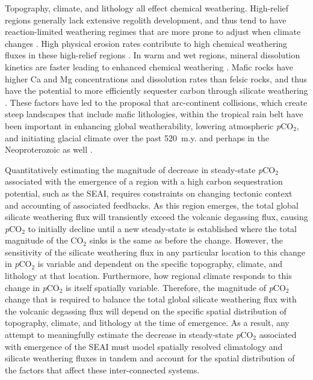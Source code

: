 \documentclass[9pt,twocolumn,twoside,lineno]{pnas-new}
\newcommand{\pCOtwo}{\textit{p}CO$_{2}$\xspace}
\newcommand{\COtwo}{CO$_{2}$\xspace}
\begin{document}
Topography, climate, and lithology all effect chemical weathering. High-relief regions generally lack extensive regolith development, and thus tend to have reaction-limited weathering regimes that are more prone to adjust when climate changes \cite{Gabet2009a, West2012a, Maher2014a}. High physical erosion rates contribute to high chemical weathering fluxes in these high-relief regions \citep{Godderis2017b}. In warm and wet regions, mineral dissolution kinetics are faster leading to enhanced chemical weathering \cite{Lasaga1994a, West2012a}. Mafic rocks have higher Ca and Mg concentrations and dissolution rates than felsic rocks, and thus have the potential to more efficiently sequester carbon through silicate weathering \cite{Dessert2003a}. These factors have led to the proposal that arc-continent collisions, which create steep landscapes that include mafic lithologies, within the tropical rain belt have been important in enhancing global weatherability, lowering atmospheric \pCOtwo, and initiating glacial climate over the past 520~m.y. \cite{Jagoutz2016a, Swanson-Hysell2017a, Macdonald2019a} and perhaps in the Neoproterozoic as well \cite{Park2020a}.

Quantitatively estimating the magnitude of decrease in steady-state \pCOtwo associated with the emergence of a region with a high carbon sequestration potential, such as the SEAI, requires constraints on changing tectonic context and accounting of associated feedbacks. As this region emerges, the total global silicate weathering flux will transiently exceed the volcanic degassing flux, causing \pCOtwo to initially decline until a new steady-state is established where the total magnitude of the \COtwo sinks is the same as before the change. However, the sensitivity of the silicate weathering flux in any particular location to this change in \pCOtwo is variable and dependent on the specific topography, climate, and lithology at that location. Furthermore, how regional climate responds to this change in \pCOtwo is itself spatially variable. Therefore, the magnitude of \pCOtwo change that is required to balance the total global silicate weathering flux with the volcanic degassing flux will depend on the specific spatial distribution of topography, climate, and lithology at the time of emergence. As a result, any attempt to meaningfully estimate the decrease in steady-state \pCOtwo associated with emergence of the SEAI must model spatially resolved climatology and silicate weathering fluxes in tandem and account for the spatial distribution of the factors that affect these inter-connected systems.
\end{document}
